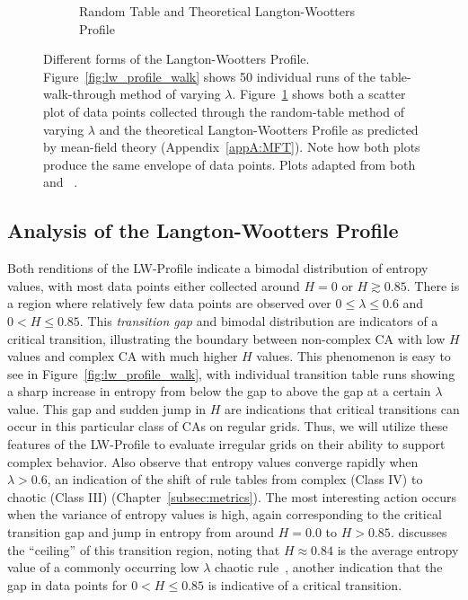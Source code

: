 \documentclass[a4paper,11pt,twoside]{report}
\begin{document}
\begin{figure}[htp]
\begin{subfigure}[t]{0.6\textwidth}
  \caption{Random Table and Theoretical Langton-Wootters Profile}
  \label{fig:lw_profile_rand}
  \end{subfigure}
\caption[The Langton-Wootters Profile]{
  Different forms of the Langton-Wootters Profile. Figure~\ref{fig:lw_profile_walk} shows 50 individual runs of the table-walk-through method of varying $\lambda$. Figure~\ref{fig:lw_profile_rand} shows both a scatter plot of data points collected through the random-table method of varying $\lambda$ and the theoretical Langton-Wootters Profile as predicted by mean-field theory (Appendix~\ref{appA:MFT}). Note how both plots produce the same envelope of data points. Plots adapted from both \citeauthor{la90} and \citeauthor{wo90}~\cite{la90,wo90}.
}
\label{fig:lw_profile}
\end{figure}

\subsection*{Analysis of the Langton-Wootters Profile}

Both renditions of the LW-Profile indicate a bimodal distribution of entropy values, with most data points either collected around $H=0$ or $H \gtrsim 0.85$. There is a region where relatively few data points are observed over $0 \le \lambda \le 0.6$ and $0 < H \le 0.85$. This \textit{transition gap} and bimodal distribution are indicators of a critical transition, illustrating the boundary between non-complex CA with low $H$ values and complex CA with much higher $H$ values. This phenomenon is easy to see in Figure~\ref{fig:lw_profile_walk}, with individual transition table runs showing a sharp increase in entropy from below the gap to above the gap at a certain $\lambda$ value. This gap and sudden jump in $H$ are indications that critical transitions can occur in this particular class of CAs on regular grids. Thus, we will utilize these features of the LW-Profile to evaluate irregular grids on their ability to support complex behavior. 
Also observe that entropy values converge rapidly when $\lambda > 0.6$, an indication of the shift of rule tables from complex (Class IV) to chaotic (Class III) (Chapter~\ref{subsec:metrics}). The most interesting action occurs when the variance of entropy values is high, again corresponding to the critical transition gap and jump in entropy from around $H=0.0$ to $H > 0.85$. \citeauthor{la90} discusses the ``ceiling'' of this transition region, noting that $H \approx 0.84$ is the average entropy value of a commonly occurring low $\lambda$ chaotic rule~\cite{la90}, another indication that the gap in data points for $0 < H \le 0.85$ is indicative of a critical transition.
\end{document}
